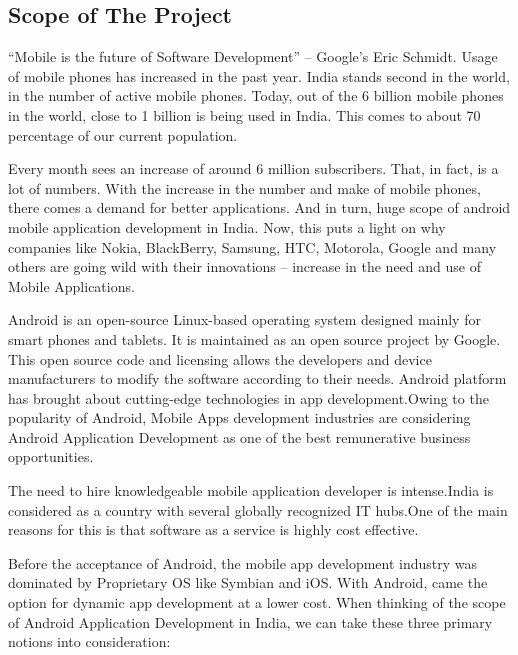 \documentclass[a4paper,12pt]{article}
\begin{document}
\subsection{Scope of The Project}\vspace{5mm}
“Mobile is the future of Software Development” – Google’s Eric Schmidt.
Usage of mobile phones has increased in the past year. India stands second in the world, in the number of active mobile phones. Today, out of the 6 billion mobile phones in the world, close to 1 billion is being used in India. This comes to about 70 percentage  of our current population.
 \par  \vspace{2mm}  
 Every month sees an increase of around 6 million subscribers. That, in fact, is a lot of numbers.
With the increase in the number and make of mobile phones, there comes a demand for better applications. And in turn, huge scope of android mobile application development in India. Now, this puts a light on why companies like Nokia, BlackBerry, Samsung, HTC, Motorola, Google and many others are going wild with their innovations – increase in the need and use of Mobile Applications.
  \par  \vspace{2mm}  
Android is an open-source Linux-based operating system designed mainly for smart phones and tablets. It is maintained as an open source project by Google. This open source code and licensing allows the developers and device manufacturers to modify the software according to their needs. Android platform has brought about cutting-edge technologies in app development.Owing to the popularity of Android, Mobile Apps development industries are considering Android Application Development as one of the best remunerative business opportunities.
 \par  \vspace{2mm}   The need to hire knowledgeable mobile application developer is intense.India is considered as a country with several globally recognized IT hubs.One of the main reasons for this is that software as a service is highly cost effective.
 \par  \vspace{2mm}
 Before the acceptance of Android, the mobile app development industry was dominated by Proprietary OS like Symbian and iOS. With Android, came the option for dynamic app development at a lower cost. When thinking of the scope of Android Application Development in India, we can take these three primary notions into consideration:
\end{document}
